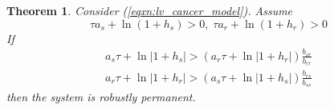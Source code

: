 \documentclass{article}
\newtheorem{theorem}{Theorem}[section]
\theoremstyle{definition}
\begin{document}
\begin{theorem}
    Consider (\ref{eqxn:lv_cancer_model}). Assume
    \begin{equation}\label{eqxn:lv_cancer_model_permanence_req_1}
        \tau a_s + \ln{(1 + h_s)} > 0 , \; \tau a_r + \ln{(1 + h_r)} > 0
    \end{equation}
    If 
    \begin{equation}\label{eqxn:lv_cancer_model_permanence_req_2}
        \begin{split}
            a_s\tau + \ln{|1+h_s|} > \left(a_r\tau + \ln{|1 + h_r|}\right)\frac{b_{sr}}{b_{rr}}\\
            a_r\tau + \ln{|1+h_r|} > \left(a_s\tau + \ln{|1 + h_s|}\right)\frac{b_{rs}}{b_{ss}}
        \end{split}
    \end{equation}
    then the system is robustly permanent.
\end{theorem}
\end{document}
